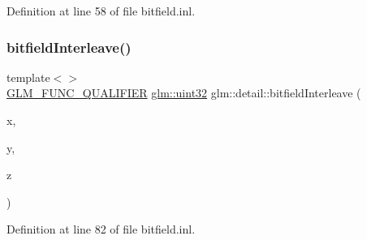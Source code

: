 Definition at line 58 of file bitfield.\+inl.

\mbox{\label{namespaceglm_1_1detail_a27e9c62ce3ad180236573daec6a6461f}} 
\subsubsection{\texorpdfstring{bitfieldInterleave()}{bitfieldInterleave()}\hspace{0.1cm}{\footnotesize\ttfamily [7/11]}}
{\footnotesize\ttfamily template$<$$>$ \\
\mbox{\hyperlink{setup_8hpp_a33fdea6f91c5f834105f7415e2a64407}{G\+L\+M\+\_\+\+F\+U\+N\+C\+\_\+\+Q\+U\+A\+L\+I\+F\+I\+ER}} \mbox{\hyperlink{group__gtc__type__precision_ga202b6a53c105fcb7e531f9b443518451}{glm\+::uint32}} glm\+::detail\+::bitfield\+Interleave (\begin{DoxyParamCaption}\item[{\mbox{\hyperlink{group__gtc__type__precision_ga1a7dcd8aac97cc8020817c94049deff2}{glm\+::uint8}}}]{x,  }\item[{\mbox{\hyperlink{group__gtc__type__precision_ga1a7dcd8aac97cc8020817c94049deff2}{glm\+::uint8}}}]{y,  }\item[{\mbox{\hyperlink{group__gtc__type__precision_ga1a7dcd8aac97cc8020817c94049deff2}{glm\+::uint8}}}]{z }\end{DoxyParamCaption})}



Definition at line 82 of file bitfield.\+inl.

\mbox{\label{namespaceglm_1_1detail_aceed48a30e6dc4f2c64945a60369d73d}} 
